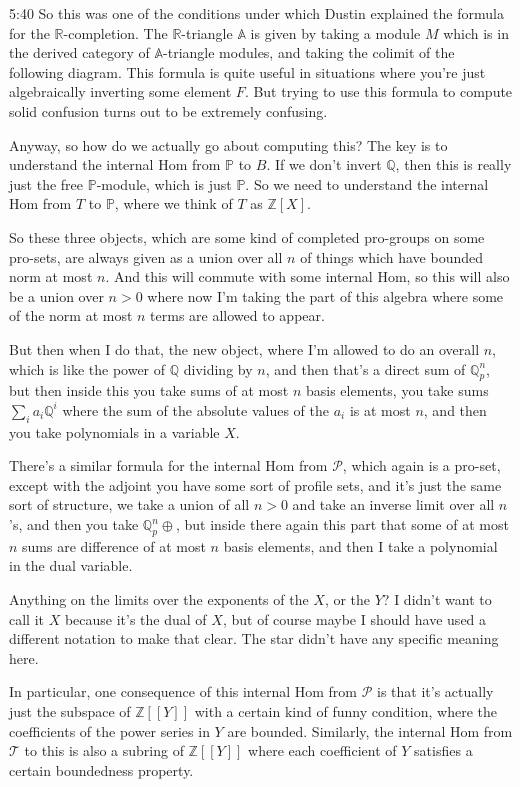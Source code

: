 \begin{unfinished}{5:40}
So this was one of the conditions under which Dustin explained the formula for the $\mathbb{R}$-completion. The $\mathbb{R}$-triangle $\mathbb{A}$ is given by taking a module $M$ which is in the derived category of $\mathbb{A}$-triangle modules, and taking the colimit of the following diagram. This formula is quite useful in situations where you're just algebraically inverting some element $F$. But trying to use this formula to compute solid confusion turns out to be extremely confusing.

Anyway, so how do we actually go about computing this? The key is to understand the internal Hom from $\mathbb{P}$ to $B$. If we don't invert $\mathbb{Q}$, then this is really just the free $\mathbb{P}$-module, which is just $\mathbb{P}$. So we need to understand the internal Hom from $T$ to $\mathbb{P}$, where we think of $T$ as $\mathbb{Z}[X]$.

So these three objects, which are some kind of completed pro-groups on some pro-sets, are always given as a union over all $n$ of things which have bounded norm at most $n$. And this will commute with some internal Hom, so this will also be a union over $n > 0$ where now I'm taking the part of this algebra where some of the norm at most $n$ terms are allowed to appear. 

But then when I do that, the new object, where I'm allowed to do an overall $n$, which is like the power of $\mathbb{Q}$ dividing by $n$, and then that's a direct sum of $\mathbb{Q}_p^n$, but then inside this you take sums of at most $n$ basis elements, you take sums $\sum_{i} a_i \mathbb{Q}^i$ where the sum of the absolute values of the $a_i$ is at most $n$, and then you take polynomials in a variable $X$.

There's a similar formula for the internal Hom from $\mathcal{P}$, which again is a pro-set, except with the adjoint you have some sort of profile sets, and it's just the same sort of structure, we take a union of all $n > 0$ and take an inverse limit over all $n$'s, and then you take $\mathbb{Q}_p^n \oplus$, but inside there again this part that some of at most $n$ sums are difference of at most $n$ basis elements, and then I take a polynomial in the dual variable.

Anything on the limits over the exponents of the $X$, or the $Y$? I didn't want to call it $X$ because it's the dual of $X$, but of course maybe I should have used a different notation to make that clear. The star didn't have any specific meaning here.

In particular, one consequence of this internal Hom from $\mathcal{P}$ is that it's actually just the subspace of $\mathbb{Z}[[Y]]$ with a certain kind of funny condition, where the coefficients of the power series in $Y$ are bounded. Similarly, the internal Hom from $\mathcal{T}$ to this is also a subring of $\mathbb{Z}[[Y]]$ where each coefficient of $Y$ satisfies a certain boundedness property.


\end{unfinished}
